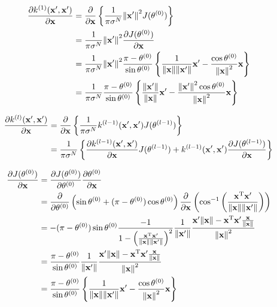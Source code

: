 \documentclass[11pt,a4j]{article}
\begin{document}
    \begin{align}
      \frac{\partial k^{(1)}({\bf x}', {\bf x}')}{\partial {\bf x}} 
      &= \frac{\partial}{\partial {\bf x}} \left\{ \frac{1}{\pi \sigma^N} {\|{\bf x}'\|}^2 J(\theta^{(0)}) \right\} \\
      &= \frac{1}{\pi \sigma^N} {\|{\bf x}'\|}^2 \frac{\partial J(\theta^{(0)})}{\partial {\bf x}} \\
      &= \frac{1}{\pi \sigma^N} {\|{\bf x}'\|}^2 \frac{ \pi - \theta^{(0)}}{ \sin \theta^{(0)}} \left\{ \frac{1}{ \|{\bf x}\| \|{\bf x}'\| } {\bf x}' - \frac{ \cos \theta^{(0)}}{{\|{\bf x}\|}^2} {\bf x} \right\} \\
      &= \frac{1}{\pi \sigma^N} \frac{ \pi - \theta^{(0)}}{ \sin \theta^{(0)}} \left\{ \frac{\|{\bf x}'\|}{ \|{\bf x}\| } {\bf x}' - \frac{ {\|{\bf x}'\|}^2 \cos \theta^{(0)}}{{\|{\bf x}\|}^2} {\bf x} \right\} 
    \end{align}

    \begin{align}
      \frac{\partial k^{(l)}({\bf x}', {\bf x}')}{\partial {\bf x}} 
      &= \frac{\partial}{\partial {\bf x}} \left\{ \frac{1}{\pi \sigma^N} k^{(l-1)}({\bf x}', {\bf x}') J(\theta^{(l-1)}) \right\} \\
      &= \frac{1}{\pi \sigma^N} \left\{ \frac{\partial k^{(l-1)}({\bf x}',{\bf x}')}{\partial {\bf x}} J(\theta^{(l-1)}) + k^{(l-1)}({\bf x}', {\bf x}') \frac{\partial J(\theta^{(l-1)})}{\partial {\bf x}} \right\}
    \end{align}

    \begin{align}
      \frac{\partial J(\theta^{(0)})}{\partial {\bf x}}
      &= \frac{\partial J(\theta^{(0)})}{\partial \theta^{(0)}} \frac{\partial \theta^{(0)}}{\partial {\bf x}} \\
      &= \frac{\partial}{\partial \theta^{(0)}} \left( \sin \theta^{(0)} + (\pi - \theta^{(0)}) \cos \theta^{(0)} \right) \frac{\partial}{\partial {\bf x}} \left( \cos^{-1} \left( \frac{{\bf x}^{\mathrm{T}}{\bf x}'}{\|{\bf x}\| \|{\bf x}'\|} \right) \right) \\
      &= - (\pi - \theta^{(0)}) \sin \theta^{(0)} \frac{-1}{1 - {\left( \frac{{\bf x}^{\mathrm{T}}{\bf x}'}{\|{\bf x}\| \|{\bf x}'\|} \right)}^2 } \frac{1}{\|{\bf x}'\|} \frac{{\bf x}'\|{\bf x}\| - {\bf x}^{\mathrm{T}}{\bf x}' \frac{\bf x}{\|{\bf x}\|}}{{\|{\bf x}\|}^2} \\
      &= \frac{ \pi - \theta^{(0)} }{\sin \theta^{(0)}} \frac{1}{\|{\bf x}'\|} \frac{{\bf x}'\|{\bf x}\| - {\bf x}^{\mathrm{T}}{\bf x}' \frac{\bf x}{\|{\bf x}\|}}{{\|{\bf x}\|}^2} \\
      &= \frac{ \pi - \theta^{(0)}}{ \sin \theta^{(0)}} \left\{ \frac{1}{ \|{\bf x}\| \|{\bf x}'\| } {\bf x}' - \frac{ \cos \theta^{(0)}}{{\|{\bf x}\|}^2} {\bf x} \right\} \\
    \end{align}
\end{document}
